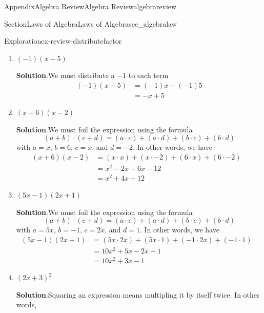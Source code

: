 \documentclass[oneside,10pt,]{tufte-book}
\newcommand{\blocktitlefont}{\relax}
\numberwithin{equation}{chapter}
\newcommand{\amp}{&}
\begin{document}
\begin{appendixptx}{Appendix}{Algebra Review}{}{Algebra Review}{}{}{algebrareview}
\begin{sectionptx}{Section}{Laws of Algebra}{}{Laws of Algebra}{}{}{sec_algebralaw}
\begin{exploration}{Exploration}{}{ex-review-distributefactor}
\begin{enumerate}[font=\bfseries,label=(\alph*),ref=\alph*]
\begin{align*}
5(x^2 - 3x + 2) \amp = 5x^2 - 15 x  + 10 
\end{align*}
%
\item{}\((-1)(x - 5)\)%
\par\smallskip%
\noindent\textbf{\blocktitlefont Solution}.\hypertarget{ex-review-distributefactor-3-2}{}\quad{}We must distribute a \(-1\) to each term%
\begin{align*}
(-1)(x - 5)	\amp = (-1)x - (-1)5 \\
\amp = -x + 5
\end{align*}
%
\item{}\((x+6)(x-2)\)%
\par\smallskip%
\noindent\textbf{\blocktitlefont Solution}.\hypertarget{ex-review-distributefactor-4-2}{}\quad{}We must foil the expression using the formula%
\begin{equation*}
(a + b) \cdot (c + d) = (a\cdot c) + (a \cdot d) + (b\cdot c) + (b\cdot d)
\end{equation*}
with \(a=x\), \(b=6\), \(c=x\), and \(d=-2\). In other words, we have%
\begin{align*}
(x+6)(x-2)\amp = (x\cdot x) + (x\cdot -2)+ (6\cdot x) + (6\cdot -2)\\
\amp = x^2 - 2x + 6x - 12 \amp \\
\amp = x^2 + 4x - 12
\end{align*}
%
\item{}\((5x-1)(2x+1)\)%
\par\smallskip%
\noindent\textbf{\blocktitlefont Solution}.\hypertarget{ex-review-distributefactor-5-2}{}\quad{}We must foil the expression using the formula%
\begin{equation*}
(a + b) \cdot (c + d) = (a\cdot c) + (a \cdot d) + (b\cdot c) + (b\cdot d)
\end{equation*}
with \(a=5x\), \(b=-1\), \(c=2x\), and \(d=1\). In other words, we have%
\begin{align*}
(5x-1)(2x+1)\amp = (5x\cdot 2x) + (5x\cdot 1)+ (-1\cdot 2x) + (-1\cdot 1)\\
\amp = 10x^2 + 5x - 2x - 1 \amp \\
\amp = 10x^2 + 3x - 1
\end{align*}
%
\item{}\((2x+3)^2\)%
\par\smallskip%
\noindent\textbf{\blocktitlefont Solution}.\hypertarget{ex-review-distributefactor-6-2}{}\quad{}Squaring an expression means multipling it by itself twice. In other words,%
\begin{align*}

\end{align*}
\end{enumerate}
\end{exploration}
\end{sectionptx}
\end{appendixptx}
\end{document}
